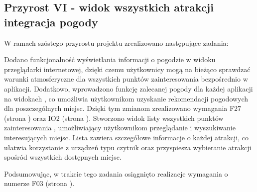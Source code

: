 
    \subsection{Przyrost VI - widok wszystkich atrakcji integracja pogody}
    \label{sec:przyrost6}

    W ramach szóstego przyrostu projektu zrealizowano następujące zadania:
  
    \indent Dodano funkcjonalność wyświetlania informacji o pogodzie w widoku 
    przeglądarki internetowej, dzięki czemu użytkownicy mogą na bieżąco sprawdzać warunki atmosferyczne dla wszystkich punktów zainteresowania bezpośrednio w aplikacji. 
    Dodatkowo, wprowadzono funkcję zalecanej pogody dla każdej aplikacji na widokach , 
    co umożliwia użytkownikom uzyskanie rekomendacji pogodowych dla poszczególnych miejsc. Dzięki tym zmianom zrealizowano wymagania F27 (strona \pageref{tab:requirements:func27}) oraz IO2 (strona \pageref{tab:requirements:env2}).
    \indent Stworzono widok listy wszystkich punktów zainteresowania , umożliwiający użytkownikom 
    przeglądanie i wyszukiwanie interesujących miejsc. Lista zawiera szczegółowe informacje 
    o każdej atrakcji, co ułatwia korzystanie z urządzeń 
    typu czytnik oraz przyspiesza wybieranie atrakcji spośród wszystkich dostępnych miejsc. 
    
    Podsumowując, w trakcie tego zadania osiągnięto realizacje wymagania o numerze F03 (strona \pageref{tab:requirements:func3}).


